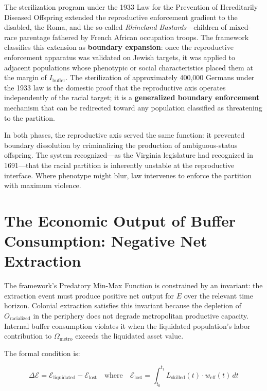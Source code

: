 The sterilization program under the 1933 Law for the Prevention of Hereditarily Diseased Offspring extended the reproductive enforcement gradient to the disabled, the Roma, and the so-called \textit{Rhineland Bastards}---children of mixed-race parentage fathered by French African occupation troops. The framework classifies this extension as \textbf{boundary expansion}: once the reproductive enforcement apparatus was validated on Jewish targets, it was applied to adjacent populations whose phenotypic or social characteristics placed them at the margin of $I_{\text{buffer}}$. The sterilization of approximately 400,000 Germans under the 1933 law is the domestic proof that the reproductive axis operates independently of the racial target; it is a \textbf{generalized boundary enforcement} mechanism that can be redirected toward any population classified as threatening to the partition.

In both phases, the reproductive axis served the same function: it prevented boundary dissolution by criminalizing the production of ambiguous-status offspring. The system recognized---as the Virginia legislature had recognized in 1691---that the racial partition is inherently unstable at the reproductive interface. Where phenotype might blur, law intervenes to enforce the partition with maximum violence.

\section{The Economic Output of Buffer Consumption: Negative Net Extraction}
\label{sec:negative_extraction}

The framework's Predatory Min-Max Function is constrained by an invariant: the extraction event must produce positive net output for $E$ over the relevant time horizon. Colonial extraction satisfies this invariant because the depletion of $O_{\text{racialized}}$ in the periphery does not degrade metropolitan productive capacity. Internal buffer consumption violates it when the liquidated population's labor contribution to $\Omega_{\text{metro}}$ exceeds the liquidated asset value.

The formal condition is:

\begin{equation}\label{eq:german-net-extraction}
\Delta \mathcal{E} = \mathcal{E}_{\text{liquidated}} - \mathcal{E}_{\text{lost}} \quad \text{where} \quad \mathcal{E}_{\text{lost}} = \int_{t_0}^{t_1} L_{\text{skilled}}(t) \cdot w_{\text{eff}}(t) \, dt
\end{equation}

